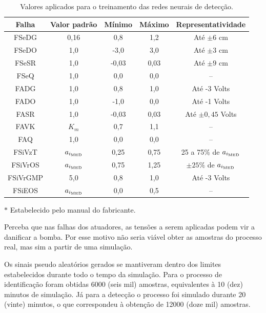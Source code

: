 \begin{table}[htb]
\small
\caption{Valores aplicados para o treinamento das redes neurais de detecção.}
\label{tab:valores_treinamento}
\vspace{0.25cm}
\centering
\begin{threeparttable}
\begin{tabular}{|c|c|c|c|c|}
\hline
{\bf Falha} & {\bf Valor padrão} & {\bf Mínimo} & {\bf Máximo} & 
{\bf Representatividade}\\
\hline
\hline
FSeDG & 0,16\tnote{$*$} & 
0,8 & 1,2 & Até $\pm 6$ cm\\
\hline
FSeDO & 1,0 & -3,0 & 3,0 & Até $\pm 3$ cm\\
\hline
FSeSR & 1,0 & -0,03 & 0,03 & Até $\pm 9$ cm\\
\hline
FSeQ & 1,0 & 0,0 & 0,0 & -- \\
\hline
\hline
FADG & 1,0 & 0,8 & 1,0 & Até -3 Volts\\
\hline
FADO & 1,0 & -1,0 & 0,0 & Até -1 Volts\\
\hline
FASR & 1,0 & -0,03 & 0,03 & Até $\pm 0,45$ Volts\\
\hline
FAVK & $K_m$ & 0,7 & 1,1 & --\\
\hline
FAQ & 1,0 & 0,0 & 0,0 & --\\
\hline
\hline
FSiVzT & $a_{i_{\text{\tiny MED}}}$ & 
0,25 & 0,75 & 25 a 75\% de $a_{i_{\text{\tiny MED}}}$\\
\hline
FSiVrOS & $a_{i_{\text{\tiny MED}}}$ & 
0,75 & 1,25 & $\pm 25\%$ de $a_{i_{\text{\tiny MED}}}$\\
\hline
FSiVrGMP & 5,0\tnote{$*$} & 
0,8 & 1,0 & Até -3 Volts\\
\hline
FSiEOS & $a_{i_{\text{\tiny MED}}}$ & 
0,0 & 0,5 & --\\
\hline
\end{tabular}
\begin{tablenotes}
\item [$*$] Estabelecido pelo manual do fabricante.
\end{tablenotes}
\end{threeparttable}
\end{table}

Perceba que nas falhas dos atuadores, as tensões a serem aplicadas podem vir a
danificar a bomba. Por esse motivo não seria viável obter as amostras do
processo real, mas sim a partir de uma simulação.

Os sinais pseudo aleatórios gerados se mantiveram dentro dos limites
estabelecidos durante todo o tempo da simulação. Para o processo de
identificação foram obtidas 6000 (seis mil) amostras, equivalentes à 10 (dez)
minutos de simulação. Já para a detecção o processo foi simulado durante 20
(vinte) minutos, o que correspondeu à obtenção de 12000 (doze mil) amostras.

